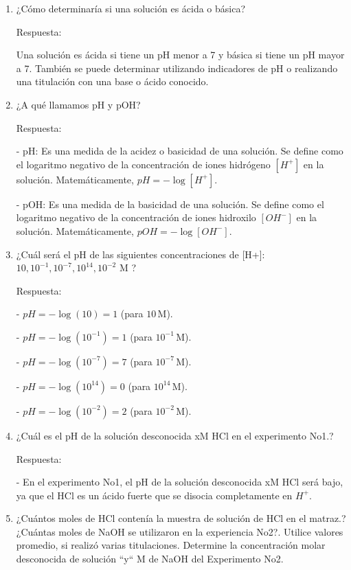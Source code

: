 \documentclass[11pt]{article}
\begin{document}
        \begin{enumerate}
            \item ¿Cómo determinaría si una solución es ácida o básica? 
            
            Respuesta:
            
            Una solución es ácida si tiene un pH menor a 7 y básica si tiene un pH mayor a 7. También se puede determinar utilizando indicadores de pH o realizando una titulación con una base o ácido conocido.
            \item ¿A qué llamamos pH y pOH?
            
            Respuesta:
            
            - pH: Es una medida de la acidez o basicidad de una solución. Se define como el logaritmo negativo de la concentración de iones hidrógeno \([H^{+}]\) en la solución. Matemáticamente, \(pH = -\log{[H^+]}\).

            - pOH: Es una medida de la basicidad de una solución. Se define como el logaritmo negativo de la concentración de iones hidroxilo \([OH^{-}]\) en la solución. Matemáticamente, \(pOH = -\log{[OH^-]}\).
            
            \item ¿Cuál será el pH de las siguientes concentraciones de [H+]: $10, 10^{-1}, 10^{-7}, 10^{14}, 10^{-2}$ M ?
            
            Respuesta:
            
            - \(pH = -\log(10) = 1\) (para \(10 \, \text{M}\)).
            
            - \(pH = -\log(10^{-1}) = 1\) (para \(10^{-1} \, \text{M}\)).
            
            - \(pH = -\log(10^{-7}) = 7\) (para \(10^{-7} \, \text{M}\)).

            - \(pH = -\log(10^{14}) = 0\) (para \(10^{14} \, \text{M}\)).
            
            - \(pH = -\log(10^{-2}) = 2\) (para \(10^{-2} \, \text{M}\)).

            \item ¿Cuál es el pH de la solución desconocida xM HCl en el experimento No1.?
            
            Respuesta:
            
            - En el experimento No1, el pH de la solución desconocida xM HCl será bajo, ya que el HCl es un ácido fuerte que se disocia completamente en \(H^+\).
            \item ¿Cuántos moles de HCl contenía la muestra de solución de HCl en el matraz.? ¿Cuántas moles de NaOH se utilizaron en la experiencia No2?. Utilice valores promedio, si realizó varias titulaciones. Determine la concentración molar desconocida de solución “y“ M de NaOH del Experimento No2.
            

\end{enumerate}
\end{document}
